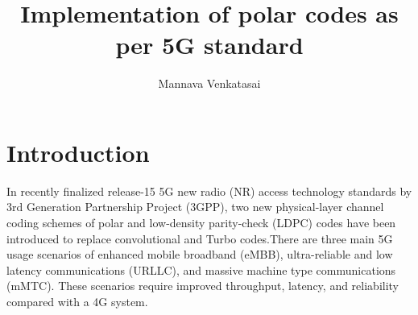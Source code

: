 \documentclass[journal,5pt,twocolumn]{IEEEtran}
\renewcommand\thesection{\arabic{section}}
\begin{document}
\let\StandardTheFigure\thefigure




\let\StandardTheFigure\thefigure
\let\StandardTheTable\thetable
\let\vec\mathbf





\def\putbox#1#2#3{\makebox[0in][l]{\makebox[#1][l]{}\raisebox{\baselineskip}[0in][0in]{\raisebox{#2}[0in][0in]{#3}}}}
     \def\rightbox#1{\makebox[0in][r]{#1}}
     \def\centbox#1{\makebox[0in]{#1}}
     \def\topbox#1{\raisebox{-\baselineskip}[0in][0in]{#1}}
     \def\midbox#1{\raisebox{-0.5\baselineskip}[0in][0in]{#1}}




\title{ 
Implementation of polar codes as per 5G standard
}



\author{Mannava Venkatasai}%



\maketitle
\tableofcontents

\section{\textbf{Introduction}}
In recently finalized release-15 5G new radio (NR) access
technology standards by 3rd Generation Partnership Project
(3GPP), two new physical-layer channel coding schemes
of polar and low-density parity-check (LDPC) codes have
been introduced to replace convolutional and Turbo codes.There are three main 5G
usage scenarios of enhanced mobile broadband (eMBB),
ultra-reliable and low latency communications (URLLC),
and massive machine type communications (mMTC).
These scenarios require improved throughput, latency, and
reliability compared with a 4G system.
\end{document}
